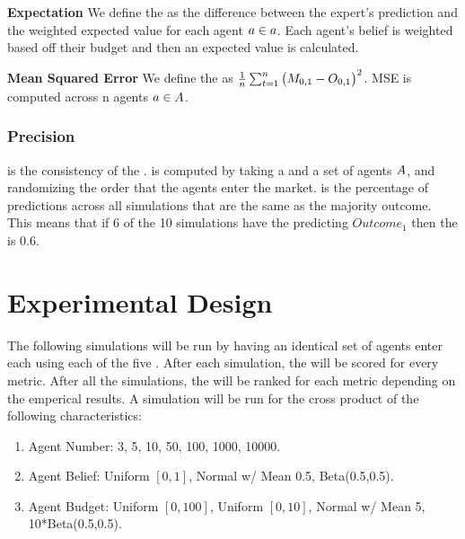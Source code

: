 \textbf{Expectation}
We define the  as the difference between the expert's prediction
and the weighted expected value for each agent $a\in a$. Each agent's belief is weighted
based off their budget and then an expected value is calculated.

\textbf{Mean Squared Error}
We define the  as $\frac{1}{n}\sum_{t=1}^{n} \big(M_{0,1} - O_{0,1}\big)^2$. MSE
is computed across n agents $a\in A$. 

\subsubsection{Precision}
 is the consistency of the .  is computed by taking a 
and a set of agents $A$, and randomizing the order that the agents enter the market.  is the
percentage of predictions across all simulations that are the same as the majority outcome. This means that if 6 of
the 10 simulations have the  predicting $Outcome_{1}$ then the  is 0.6.

\section{Experimental Design}
The following simulations will be run by having an identical set of agents enter each  using each
of the five . After each simulation, the  will be scored for every
metric. After all the simulations, the  will be ranked for each metric depending on the emperical
results. A simulation will be run for the cross product of the following characteristics:
\begin{enumerate}
  \item Agent Number: 3, 5, 10, 50, 100, 1000, 10000.
  \item Agent Belief: Uniform $[0,1]$, Normal w/ Mean 0.5, Beta(0.5,0.5).
  \item Agent Budget: Uniform $[0,100]$, Uniform $[0,10]$, Normal w/ Mean 5, 10*Beta(0.5,0.5).
\end{enumerate}
\fi
